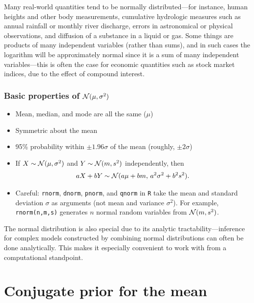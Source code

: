 \documentclass[12pt]{article}
\begin{document}
Many real-world quantities tend to be normally distributed---for instance, human heights and other body measurements, cumulative hydrologic measures such as annual rainfall or monthly river discharge, errors in astronomical or physical observations, and diffusion of a substance in a liquid or gas. Some things are products of many independent variables (rather than sums), and in such cases the logarithm will be approximately normal since it is a sum of many independent variables---this is often the case for economic quantities such as stock market indices, due to the effect of compound interest.

\subsubsection*{Basic properties of $\mathcal{N}(\mu,\sigma^2)$}
\begin{itemize}
\item Mean, median, and mode are all the same ($\mu$)
\item Symmetric about the mean
\item 95\% probability within $\pm 1.96\sigma$ of the mean (roughly, $\pm 2\sigma$)
\item If $X\sim\mathcal{N}(\mu,\sigma^2)$ and $Y\sim\mathcal{N}(m,s^2)$ independently, then
\begin{align}\label{equation:linear-combination}
a X + b Y\sim\mathcal{N}(a\mu + b m,\,a^2\sigma^2+ b^2 s^2).
\end{align}
\item Careful: \texttt{rnorm}, \texttt{dnorm}, \texttt{pnorm}, and \texttt{qnorm} in \texttt{R} take the mean and standard deviation $\sigma$ as arguments (not mean and variance $\sigma^2$). For example, \texttt{rnorm(n,m,s)} generates $n$ normal random variables from $\mathcal{N}(m,s^2)$.
\end{itemize}

The normal distribution is also special due to its analytic tractability---inference for complex models constructed by combining normal distributions can often be done analytically. This makes it especially convenient to work with from a computational standpoint.






\section{Conjugate prior for the mean}
\label{section:normal-normal}
\end{document}
